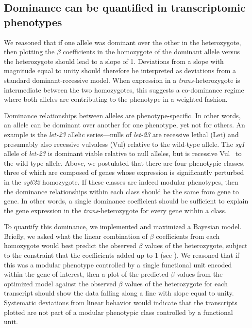 \documentclass[10pt, twocolumn]{article}
\newcommand{\gene}[1]{\mbox{\emph{#1}}}
\begin{document}
\subsection*{Dominance can be quantified in transcriptomic phenotypes}
We reasoned that if one allele was dominant over the other in the heterozygote,
then plotting the $\beta$ coefficients in the homozygote of the dominant allele
versus the heterozygote should lead to a slope of 1. Deviations from a slope
with magnitude equal to unity should therefore be interpreted as deviations from
a standard dominant-recessive model. When expression in a \emph{trans}-heterozygote
is intermediate between the two homozygotes, this suggests a co-dominance regime
where both alleles are contributing to the phenotype in a weighted fashion.

Dominance relationships between alleles are phenotype-specific. In other
words, an allele can be dominant over another for one phenotype, yet not for
others. An example is the \gene{let-23} allelic series---nulls of
\gene{let-23} are recessive lethal (Let) and presumably also recessive vulvaless
(Vul) relative to the wild-type allele. The \emph{sy1} allele of
\gene{let-23} is dominant viable relative to null alleles, but is recessive
Vul~\cite{} to the wild-type allele. Above, we postulated that there are four
phenotypic classes, three of which are composed of genes whose expression is
significantly perturbed in the \emph{sy622} homozygote.
If these classes are indeed modular phenotypes, then the dominance relationships
within each class should be the same from gene to gene. In other words, a single
dominance coefficient should be sufficient to explain the gene expression in the
\emph{trans}-heterozygote for every gene within a class.

To quantify this dominance, we implemented and maximized a Bayesian model.
Briefly, we asked what the linear combination of $\beta$ coefficients from each
homozygote would best predict the observed $\beta$ values of the heterozygote,
subject to the constraint that the coefficients added up to 1 (see
). We reasoned that if this was a modular phenotype
controlled by a single functional unit encoded within the gene of interest, then
a plot of the predicted $\beta$ values from the optimized model against the
observed $\beta$ values of the heterozygote for each transcript should show the
data falling along a line with slope equal to unity. Systematic deviations from
linear behavior would indicate that the transcripts plotted are not part of a
modular phenotypic class controlled by a functional unit.
\end{document}

